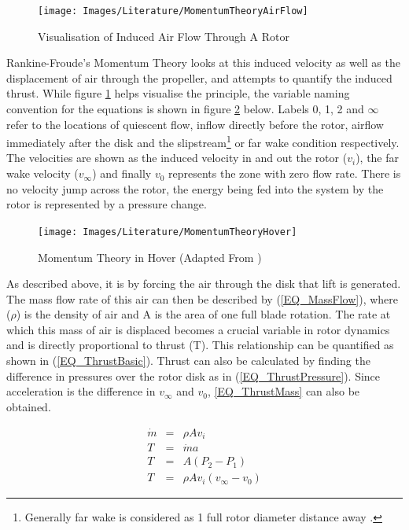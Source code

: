 	\begin{figure}[h]
	\centering
	\texttt{[image: Images/Literature/MomentumTheoryAirFlow]}	
	\caption{Visualisation of Induced Air Flow Through A Rotor \cite{Leishman}}
	\label{IM_MomentumTheoryAirFlow}
	\end{figure}
	
	Rankine-Froude's Momentum Theory looks at this induced velocity as well as the displacement of air through the propeller, and attempts to quantify the induced thrust. While figure \ref{IM_MomentumTheoryAirFlow} helps visualise the principle, the variable naming convention for the equations is shown in figure \ref{IM_MomentumTheoryHover} below. 
	Labels 0, 1, 2 and $\infty$ refer to the locations of quiescent flow, inflow directly before the rotor, airflow immediately after the disk and the slipstream\footnote{Generally far wake is considered as 1 full rotor diameter distance away \cite{Leishman}.} or far wake condition respectively.
	The velocities are shown as the induced velocity in and out the rotor ($v_{i}$), the far wake velocity ($v_{\infty}$) and finally $v_{0}$ represents the zone with zero flow rate. There is no velocity jump across the rotor, the energy being fed into the system by the rotor is represented by a pressure change.
	
	\begin{figure}[h]
	\centering
	\texttt{[image: Images/Literature/MomentumTheoryHover]}			%
	\caption{Momentum Theory in Hover (Adapted From \cite{Leishman})}
	\label{IM_MomentumTheoryHover}
	\end{figure}
	
	As described above, it is by forcing the air through the disk that lift is generated. The mass flow rate of this air can then be described by (\ref{EQ_MassFlow}), where ($\rho$) is the density of air and A is the area of one full blade rotation. The rate at which this mass of air is displaced becomes a crucial variable in rotor dynamics and is directly proportional to thrust (T). This relationship can be quantified as shown in (\ref{EQ_ThrustBasic}). Thrust can also be calculated by finding the difference in pressures over the rotor disk as in (\ref{EQ_ThrustPressure}). Since acceleration is the difference in $v_\infty$ and $v_0$, \eqref{EQ_ThrustMass} can also be obtained.
	
	\begin{eqnarray}
	\dot{m} &=& \rho A v_{i}\label{EQ_MassFlow}\\
	T &=& \dot{m}a\label{EQ_ThrustBasic}\\
	T &=& A(P_2 - P_1)\label{EQ_ThrustPressure}\\
	T &=& \rho A v_{i} (v_\infty - v_0)\label{EQ_ThrustMass}
	\end{eqnarray}
	
